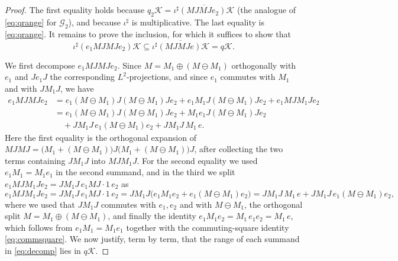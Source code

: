 \documentclass[a4paper, 11pt, reqno]{amsart}
\numberwithin{equation}{section}
\theoremstyle{plain}
\theoremstyle{remark}
\theoremstyle{definition}
\newcommand{\KK}{{\mathcal K}}
\newcommand{\GG}{{\mathcal G}}
\begin{document}
\begin{proof}
The first equality holds because $q_2\KK=\overline{\iota^\sharp(MJMJe_2)\KK}$ (the analogue of \eqref{eq:qrange} for $\GG_2$), and because $\iota^\sharp$ is multiplicative. The last equality is \eqref{eq:qrange}. It remains to prove the inclusion, for which it suffices to show that
\begin{equation}\label{eq:goal}
\iota^\sharp(e_1MJMJe_2)\KK\subseteq\overline{\iota^\sharp(MJMJe)\KK}=q\KK .
\end{equation}

We first decompose $e_1MJMJe_2$. Since $M=M_1\oplus(M\ominus M_1)$ orthogonally with $e_1$ and $Je_1J$ the corresponding $L^2$-projections, and since $e_1$ commutes with $M_1$ and with $JM_1J$, we have
\begin{align}
e_1MJMJe_2
&=e_1(M\ominus M_1)J(M\ominus M_1)Je_2
 +e_1M_1J(M\ominus M_1)Je_2
 +e_1MJM_1Je_2 \nonumber\\
&=e_1(M\ominus M_1)J(M\ominus M_1)Je_2
 +M_1e_1J(M\ominus M_1)Je_2 \nonumber\\
&\quad
 +JM_1J\,e_1(M\ominus M_1)e_2
 +JM_1J\,M_1\,e .\label{eq:decomp}
\end{align}
Here the first equality is the orthogonal expansion of $MJMJ=\big(M_1+(M\ominus M_1)\big)J\big(M_1+(M\ominus M_1)\big)J$, after collecting the two terms containing $JM_1J$ into $MJM_1J$. For the second equality we used $e_1M_1=M_1e_1$ in the second summand, and in the third we split $e_1MJM_1Je_2=JM_1J\,e_1MJ\!\cdot\!1\,e_2$ as
\[
e_1MJM_1Je_2=JM_1J\,e_1MJ\!\cdot\!1\,e_2=JM_1J\big(e_1M_1e_2+e_1(M\ominus M_1)e_2\big)
=JM_1J\,M_1\,e+JM_1J\,e_1(M\ominus M_1)e_2,
\]
where we used that $JM_1J$ commutes with $e_1,e_2$ and with $M\ominus M_1$, the orthogonal split $M=M_1\oplus(M\ominus M_1)$, and finally the identity $e_1M_1e_2=M_1\,e_1e_2=M_1\,e$, which follows from $e_1M_1=M_1e_1$ together with the commuting-square identity \eqref{eq:commsquare}. We now justify, term by term, that the range of each summand in \eqref{eq:decomp} lies in $q\KK$.


\end{proof}
\end{document}
